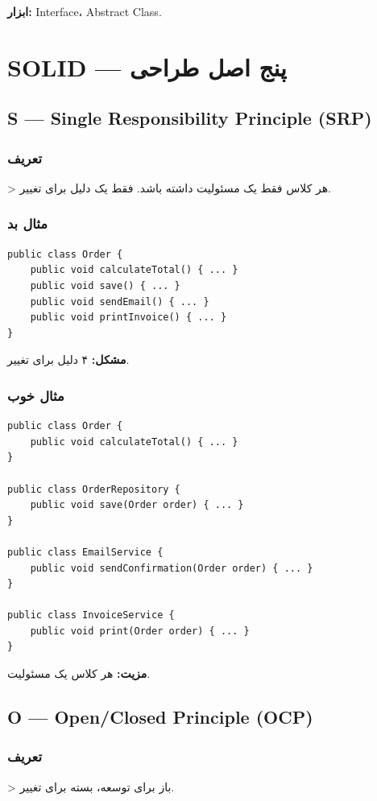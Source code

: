 \documentclass[12pt, a4paper]{article}
\begin{document}
\textbf{ابزار:} Interface، Abstract Class.

\section{SOLID — پنج اصل طراحی}

\subsection{S — Single Responsibility Principle (SRP)}

\subsubsection{تعریف}
> هر کلاس فقط یک مسئولیت داشته باشد. فقط یک دلیل برای تغییر.

\subsubsection{مثال بد}
\begin{lstlisting}
public class Order {
    public void calculateTotal() { ... }
    public void save() { ... }
    public void sendEmail() { ... }
    public void printInvoice() { ... }
}
\end{lstlisting}

\textbf{مشکل:} ۴ دلیل برای تغییر.

\subsubsection{مثال خوب}
\begin{lstlisting}
public class Order {
    public void calculateTotal() { ... }
}

public class OrderRepository {
    public void save(Order order) { ... }
}

public class EmailService {
    public void sendConfirmation(Order order) { ... }
}

public class InvoiceService {
    public void print(Order order) { ... }
}
\end{lstlisting}

\textbf{مزیت:} هر کلاس یک مسئولیت.

\subsection{O — Open/Closed Principle (OCP)}

\subsubsection{تعریف}
> باز برای توسعه، بسته برای تغییر.
\end{document}
